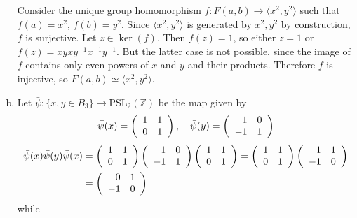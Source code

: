 \documentclass{article}
\begin{document}
\begin{Answer}
\begin{enumerate}[(a)]
{    Consider the unique group homomorphism
    $f : F(a,b) \to \langle x^2, y^2 \rangle$ such that
    $f(a) = x^2$, $f(b) = y^2$. Since $\langle x^2, y^2 \rangle$ is
    generated by $x^2, y^2$ by construction, $f$ is surjective.
    Let $z \in \ker(f)$. Then $f(z) = 1$, so either
    $z = 1$ or $f(z) = xyxy^{-1}x^{-1}y^{-1}$. But the latter case is
    not possible, since the image of $f$ contains only even powers of
    $x$ and $y$ and their products. Therefore $f$ is injective, so
    $F(a, b) \simeq \langle x^2, y^2 \rangle$.
  }
  \item{
    Let $\bar{\psi} : \{ x , y \in B_3 \} \to
    \mathrm{PSL}_2(\mathbb{Z})$ be the map given by
    $$
    \bar{\psi}(x) =
    \left(\begin{array}{r r}
      1 & 1 \\
      0 & 1
    \end{array}\right), \quad
    \bar{\psi}(y) =
    \left(\begin{array}{r r}
      1 & 0 \\
     -1 & 1
    \end{array}\right)
    $$
    \begin{align*}
    \bar{\psi}(x)\bar{\psi}(y)\bar{\psi}(x)
    &=
    \left(\begin{array}{r r}
      1 & 1 \\
      0 & 1
    \end{array}\right)
    \left(\begin{array}{r r}
      1 & 0 \\
     -1 & 1
    \end{array}\right)
    \left(\begin{array}{r r}
      1 & 1 \\
      0 & 1
    \end{array}\right)
    =
    \left(\begin{array}{r r}
      1 & 1 \\
      0 & 1
    \end{array}\right)
     \left(\begin{array}{r r}
      1 & 1 \\
     -1 & 0
    \end{array}\right)
    \\ &=
    \left(\begin{array}{r r}
      0 & 1 \\
     -1 & 0
    \end{array}\right)
    \end{align*}
    while
    \begin{align*}

\end{align*}}
\end{enumerate}
\end{Answer}
\end{document}
